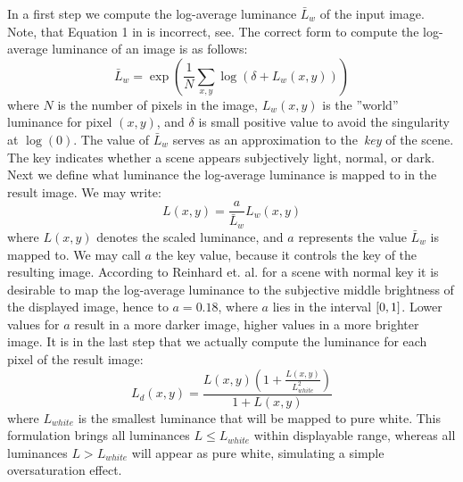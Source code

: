 In a first step we compute the log-average luminance $\bar L_w$ of the input image.
Note, that Equation 1 in\cite{Reinhard:2002} is incorrect, see\cite{Reinhard:2002:erratum}.
The correct form to compute the log-average luminance of an image is as follows:
\begin{equation}
 \bar L_w = \exp\left(\frac{1}{N}\sum\limits_{x,y}\log(\delta + L_w(x,y))\right)
\end{equation}
where $N$ is the number of pixels in the image, $L_w(x,y)$ is the ''world'' luminance
for pixel $(x,y)$, and $\delta$ is small positive value to avoid the singularity at
$\log(0)$. The value of $\bar L_w$ serves as an approximation to the~\emph{key} of
the scene. The key indicates whether a scene appears subjectively light, normal, or
dark. Next we define what luminance the log-average luminance is mapped to in the
result image. We may write:
\begin{equation}
\label{eq:luminance_scaling_reinhard}
 L(x,y) = \frac{a}{\bar L_w}L_w(x,y)
\end{equation}
where $L(x,y)$ denotes the scaled luminance, and $a$ represents the value
$\bar L_w$ is mapped to.
We may call $a$ the key value, because it controls the key of the resulting image.
According to Reinhard et. al. for a scene with normal key it is desirable to
map the log-average luminance to the subjective middle brightness of the
displayed image, hence to $a=0.18$, where $a$ lies in the interval
$\interval{0}{1}$. Lower values for $a$ result in a more darker image, higher
values in a more brighter image. It is in the last step that we actually
compute the luminance for each pixel of the result image:
\begin{equation}
\label{eq:reinhard_operator}
 L_d(x,y) = \frac{L(x,y)\left(1+\frac{L(x,y)}{L^2_{white}}\right)}{1+L(x,y)}
\end{equation}
where $L_{white}$ is the smallest luminance that will be mapped to pure white.
This formulation brings all luminances $L \leq L_{white}$ within displayable
range, whereas all luminances $L > L_{white}$ will appear as pure white,
simulating a simple oversaturation effect.

